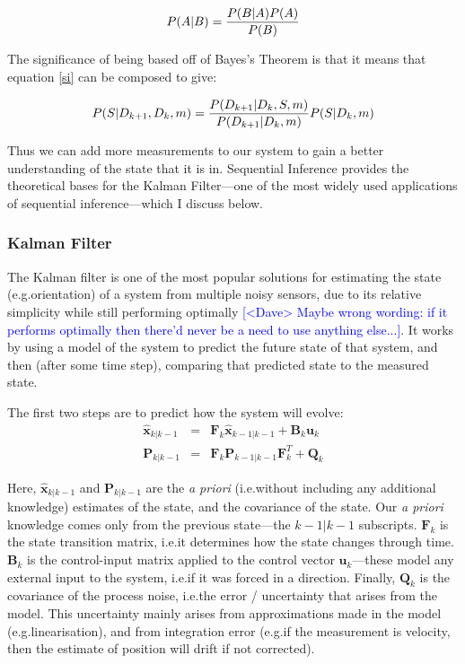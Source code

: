 \documentclass[12pt]{article}
\newcommand{\note}[2][red]{\textcolor{#1}{#2}}
\newcommand{\notedme}[1]{\note[blue]{[<Dave> #1]}}
\begin{document}
\begin{equation}
	P(A | B) = {P(B|A) P(A) \over P(B)}
\end{equation}

The significance of being based off of Bayes's Theorem is that it means that equation \ref{si} can be composed to give:

\begin{equation}
	P(S|D_{k+1},D_k,m) = {P(D_{k+1}|D_k,S,m) \over P(D_{k+1}|D_k,m)} P(S | D_k, m)
\end{equation}

\noindent Thus we can add more measurements to our system to gain a better understanding of the state that it is in. Sequential Inference provides the theoretical bases for the Kalman Filter---one of the most widely used applications of sequential inference---which I discuss below.

\subsubsection{Kalman Filter}

The Kalman filter \cite{kalman_1960} is one of the most popular solutions for estimating the state (e.g.\@ orientation) of a system from multiple noisy sensors, due to its relative simplicity while still performing optimally \cite{wangyan_2015} \notedme{Maybe wrong wording: if it performs optimally then there'd never be a need to use anything else...}. It works by using a model of the system to predict the future state of that system, and then (after some time step), comparing that predicted state to the measured state.

The first two steps are to predict how the system will evolve:
\begin{eqnarray}
	\mathbf{\hat{x}}_{k | k-1} &=& \mathbf{F}_k \mathbf{\hat{x}}_{k-1|k-1} + \mathbf{B}_k \mathbf{u}_k \\
	\mathbf{P}_{k|k-1} &=& \mathbf{F}_k \mathbf{P}_{k-1 | k-1} \mathbf{F}^T_k + \mathbf{Q}_k
\end{eqnarray}

Here, $\mathbf{\hat{x}}_{k | k-1}$ and $\mathbf{P}_{k|k-1}$ are the \emph{a priori} (i.e.\@ without including any additional knowledge) estimates of the state, and the covariance of the state. Our \emph{a priori} knowledge comes only from the previous state---the $k-1|k-1$ subscripts. $\mathbf{F}_k$ is the state transition matrix, i.e.\@ it determines how the state changes through time. $\mathbf{B}_k$ is the control-input matrix applied to the control vector $\mathbf{u}_k$---these model any external input to the system, i.e.\@ if it was forced in a direction. Finally, $\mathbf{Q}_k$ is the covariance of the process noise, i.e.\@ the error / uncertainty that arises from the model. This uncertainty mainly arises from approximations made in the model (e.g.\@ linearisation), and from integration error (e.g.\@ if the measurement is velocity, then the estimate of position will drift if not corrected).
\end{document}
